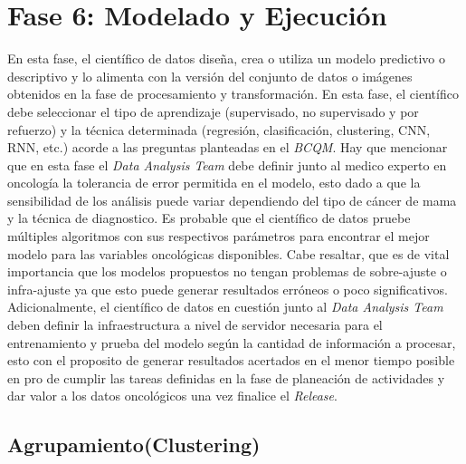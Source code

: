 \section{Fase 6: Modelado y Ejecución}
En esta fase, el científico de datos diseña, crea o utiliza un modelo predictivo o descriptivo y lo alimenta con la versión del conjunto de datos o imágenes obtenidos en la fase de procesamiento y transformación. En esta fase, el científico debe seleccionar el tipo de aprendizaje (supervisado, no supervisado y por refuerzo) y la técnica determinada (regresión, clasificación, clustering, CNN, RNN, etc.) acorde a las preguntas planteadas en el \textit{BCQM}. Hay que mencionar que en esta fase el \textit{Data Analysis Team} debe definir junto al medico experto en oncología la tolerancia de error permitida en el modelo, esto dado a que la sensibilidad de los análisis puede variar dependiendo del tipo de cáncer de mama y la técnica de diagnostico. Es probable que el científico de datos pruebe múltiples algoritmos con sus respectivos parámetros para encontrar el mejor modelo para las variables oncológicas disponibles. Cabe resaltar, que es de vital importancia que los modelos propuestos no tengan problemas de sobre-ajuste o infra-ajuste ya que esto puede generar resultados erróneos o poco significativos. Adicionalmente, el científico de datos en cuestión junto al \textit{Data Analysis Team} deben definir la infraestructura a nivel de servidor necesaria para el entrenamiento y prueba del modelo según la cantidad de información a procesar, esto con el proposito de generar resultados acertados en el menor tiempo posible en pro de cumplir las tareas definidas en la fase de planeación de actividades y dar valor a los datos oncológicos una vez finalice el \textit{Release}.

\subsection{Agrupamiento(Clustering)}

